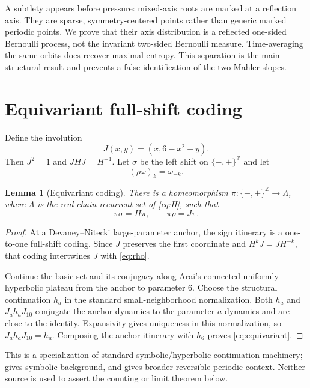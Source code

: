 \documentclass[11pt]{article}
\newtheorem{lemma}[theorem]{Lemma}
\theoremstyle{remark}
\newcommand{\Z}{\mathbb Z}
\newcommand{\SigmaTwo}{\{-,+\}^{\Z}}
\begin{document}
A subtlety appears before pressure: mixed-axis roots are marked at a
reflection axis.  They are sparse, symmetry-centered points rather than
generic marked periodic points.  We prove that their axis distribution is a
reflected one-sided Bernoulli process, not the invariant two-sided Bernoulli
measure.  Time-averaging the same orbits does recover maximal entropy.  This
separation is the main structural result and prevents a false identification
of the two Mahler slopes.

\section{Equivariant full-shift coding}

Define the involution
\begin{equation}\label{eq:J}
 J(x,y)=(x,6-x^2-y).
\end{equation}
Then $J^2=1$ and $JHJ=H^{-1}$.  Let $\sigma$ be the left shift on
$\SigmaTwo$ and let
\begin{equation}\label{eq:rho}
 (\rho\omega)_k=\omega_{-k}.
\end{equation}

\begin{lemma}[Equivariant coding]\label{lem:equivariant}
There is a homeomorphism $\pi:\SigmaTwo\to\Lambda$, where $\Lambda$ is the
real chain recurrent set of \eqref{eq:H}, such that
\begin{equation}\label{eq:equivariant}
 \pi\sigma=H\pi,\qquad \pi\rho=J\pi.
\end{equation}
\end{lemma}

\begin{proof}
At a Devaney--Nitecki large-parameter anchor, the sign itinerary is a
one-to-one full-shift coding.  Since $J$ preserves the first coordinate and
$H^kJ=JH^{-k}$, that coding intertwines $J$ with \eqref{eq:rho}.

Continue the basic set and its conjugacy along Arai's connected uniformly
hyperbolic plateau from the anchor to parameter $6$.  Choose the structural
continuation $h_a$ in the standard small-neighborhood normalization.  Both
$h_a$ and $J_a h_aJ_{10}$ conjugate the anchor dynamics to the parameter-$a$
dynamics and are close to the identity.  Expansivity gives uniqueness in
this normalization, so $J_a h_aJ_{10}=h_a$.  Composing the anchor itinerary
with $h_6$ proves \eqref{eq:equivariant}.
\end{proof}

This is a specialization of standard symbolic/hyperbolic continuation
machinery; \citet{LindMarcus1995} gives symbolic background, and
\citet{Kang2018} gives broader reversible-periodic context.  Neither source
is used to assert the counting or limit theorem below.
\end{document}
